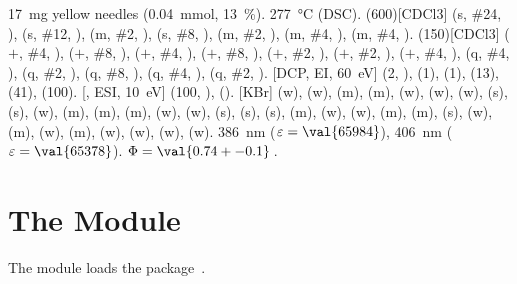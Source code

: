 \documentclass{chemmacros-manual}
\begin{document}
\begin{experimental}[
    format=\color{red}\itshape,
    list=true,
    delta=\textcolor{green}{\ch{M+ + H2O}},
    pos-number=side,
    coupling-unit=\mega\gram\per\square\second,
    list-setup=,use-equal]
   \qty{17}{\milli\gram} yellow needles (\qty{0.04}{\milli\mole},
  \qty{13}{\percent}).
   \qty{277}{\celsius} (DSC).
  \NMR(600)[CDCl3]  (s, \#{24}, ),  (s, \#{12},
  ),  (m, \#{2}, ),  (s, \#{8},
  ),  (m, \#{2}, ),  (m, \#{4},
  ),  (m, \#{4}, ).
  (150)[CDCl3]  ($+$, \#{4}, ),  ($+$,
  \#{8}, ),  ($+$, \#{4}, ),  ($+$, \#{8},
  ),  ($+$, \#{2}, ),  ($+$, \#{2},
  ),  ($+$, \#{4}, ),  (q, \#{4},
  ),  (q, \#{2}, ),  (q, \#{8}, ),
   (q, \#{4}, ),  (q, \#{2}, ).
  [DCP, EI, \qty{60}{\electronvolt}]  (2, ), 
  (1),  (1),  (13),  (41),  (100).
  [, ESI, \qty{10}{\electronvolt}]  (100,
  ),  ().
  [KBr]  (w),  (w),  (m), 
  (m),  (w),  (w),  (w),  (s),
   (s),  (w),  (m),  (m), 
  (m),  (w),  (w),  (s),  (s),
   (s),  (m),  (w),  (w), 
  (m),  (m),  (s),  (w),  (m), 
  (w),  (m),  (w),  (w),  (w), 
  (w).
   \qty{386}{\nano\metre} ($\varepsilon = \val{65984}$),
  \qty{406}{\nano\metre} ($\varepsilon = \val{65378}$).
   $\Phi = \val{0.74+-0.1}$\,.
\end{experimental}

\section{The  Module}\label{sec:thermodynamics-module}

The  module loads the 
package~\cite{pkg:siunitx}.
\end{document}
